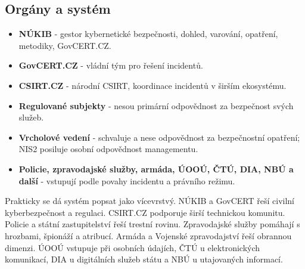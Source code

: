 \subsection*{Orgány a systém}
\begin{itemize}
  \item \textbf{NÚKIB} - gestor kybernetické bezpečnosti, dohled, varování, opatření, metodiky, GovCERT.CZ.
  \item \textbf{GovCERT.CZ} - vládní tým pro řešení incidentů.
  \item \textbf{CSIRT.CZ} - národní CSIRT, koordinace incidentů v širším ekosystému.
  \item \textbf{Regulované subjekty} - nesou primární odpovědnost za bezpečnost svých služeb.
  \item \textbf{Vrcholové vedení} - schvaluje a nese odpovědnost za bezpečnostní opatření; NIS2 posiluje osobní odpovědnost managementu.
  \item \textbf{Policie, zpravodajské služby, armáda, ÚOOÚ, ČTÚ, DIA, NBÚ a další} - vstupují podle povahy incidentu a právního režimu.
\end{itemize}

Prakticky se dá systém popsat jako vícevrstvý. NÚKIB a GovCERT řeší civilní kyberbezpečnost a regulaci. CSIRT.CZ podporuje širší technickou komunitu. Policie a státní zastupitelství řeší trestní rovinu. Zpravodajské služby pomáhají s hrozbami, špionáží a atribucí. Armáda a Vojenské zpravodajství řeší obrannou dimenzi. ÚOOÚ vstupuje při osobních údajích, ČTÚ u elektronických komunikací, DIA u digitálních služeb státu a NBÚ u utajovaných informací.





\newpage

